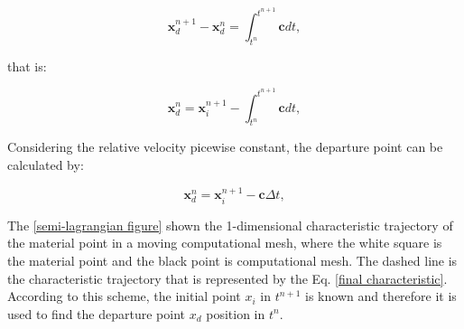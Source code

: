 \begin{equation} 
\textbf{x}_{d}^{n+1} - \textbf{x}_{d}^{n} 
= \int_{t^{n}}^{t^{n+1}} \textbf{c} dt, 
\end{equation}

\medskip
\noindent
that is:

\begin{equation} 
\textbf{x}_{d}^{n} = \textbf{x}_{i}^{n+1} 
- \int_{t^{n}}^{t^{n+1}} \textbf{c}  dt, 
\end{equation}


\medskip
\noindent
Considering the relative velocity picewise constant,
the departure point can be calculated by:

\begin{equation} \label{final characteristic}
\textbf{x}_{d}^{n} = \textbf{x}_{i}^{n+1} 
- \textbf{c} \Delta t, 
\end{equation}

\medskip
The \ref{semi-lagrangian figure} shown 
the 1-dimensional characteristic trajectory of
the material point in a moving computational mesh,
where the white square is the material point and
the black point is computational mesh.
The dashed line is the characteristic trajectory
that is represented by the Eq. \ref{final characteristic}.
According to this scheme, the initial point $x_i$ in $t^{n+1}$ is known
and therefore it is used to find 
the departure point $x_d$ position in $t^{n}$.


